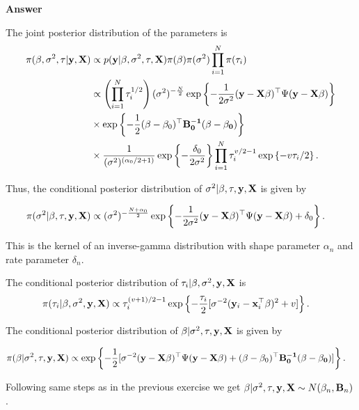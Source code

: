 \begin{enumerate}[leftmargin=*]
\textbf{Answer}

The joint posterior distribution of the parameters is
\begin{align*}
	\pi(\beta, \sigma^2, \tau|\bf{y}, {\bf{X}}) & \propto p({\bf{y}}|\beta, \sigma^2, \tau, {\bf{X}}) \pi(\beta) \pi(\sigma^2) \prod_{i=1}^N \pi(\tau_i) \\
	&\propto \left(\prod_{i=1}^N \tau_i^{1/2}\right)(\sigma^2)^{-\frac{N}{2}}\exp\left\{-\frac{1}{2\sigma^2}({\bf{y}}-{\bf{X}}\beta)^{\top}\Psi({\bf{y}}-{\bf{X}}\beta)\right\}\\
	&\times \exp\left\{-\frac{1}{2}(\beta - \beta _0)^{\top}\bf{B}_0^{-1}(\beta - \beta _0)\right\}\\
	&\times\frac{1}{(\sigma^2)^{(\alpha_0/2+1)}}\exp\left\{-\frac{\delta_0}{2\sigma^2}\right\}\prod_{i=1}^N \tau_i^{v/2-1}\exp\left\{-v\tau_i/2\right\}.
\end{align*}

Thus, the conditional posterior distribution of $\sigma^2|\beta, \tau, \bf{y}, {\bf{X}}$ is given by

\begin{align*}
	\pi(\sigma^2|\beta, \tau, \bf{y}, {\bf{X}}) & \propto (\sigma^2)^{-\frac{N+\alpha_0}{2}}\exp\left\{-\frac{1}{2\sigma^2}({\bf{y}}-{\bf{X}}\beta)^{\top}\Psi({\bf{y}}-{\bf{X}}\beta)+\delta_0\right\}.
\end{align*}

This is the kernel of an inverse-gamma distribution with shape parameter $\alpha_n$ and rate parameter $\delta_n$.

The conditional posterior distribution of $\tau_i|\beta, \sigma^2, \bf{y}, {\bf{X}}$ is
\begin{align*}
	\pi(\tau_i|\beta, \sigma^2,\bf{y}, {\bf{X}}) & \propto
	\tau_i^{(v+1)/2-1}\exp\left\{-\frac{\tau_i}{2}[\sigma^{-2}({\bf{y}}_i-{\bf{x}}_i^{\top}\beta)^2+v]\right\}.
\end{align*}

The conditional posterior distribution of $\beta|\sigma^2, \tau, \bf{y}, {\bf{X}}$ is given by

\begin{align*}
	\pi(\beta| \sigma^2, \tau, \bf{y}, {\bf{X}}) & \propto \exp\left\{-\frac{1}{2}[\sigma^{-2}({\bf{y}}-{\bf{X}}\beta)^{\top}\Psi({\bf{y}}-{\bf{X}}\beta)+(\beta - \beta _0)^{\top}\bf{B}_0^{-1}(\beta - \beta _0)]\right\}.
\end{align*} 

Following same steps as in the previous exercise we get $\beta|\sigma^2,\tau,{\bf{y}},{\bf{X}}\sim N(\beta_n,{\bf{B}}_n)$.


\end{enumerate}
